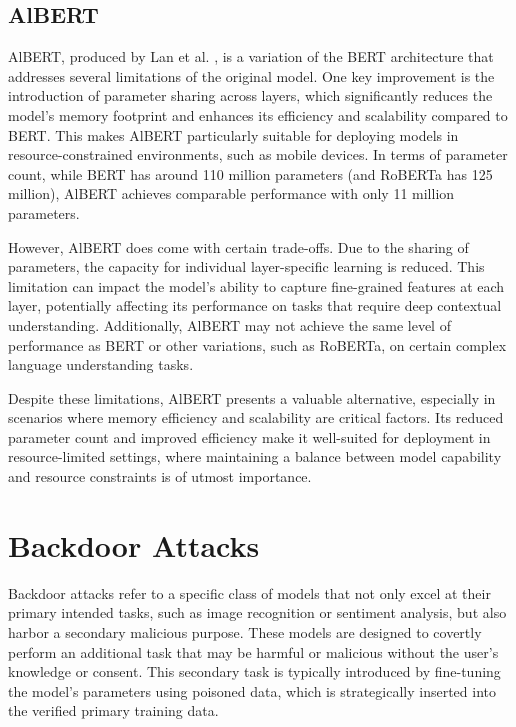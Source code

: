 \subsection{AlBERT}

AlBERT, produced by Lan et al. \cite{AlBERT}, is a variation of the BERT architecture that addresses several limitations of the original model. One key improvement is the introduction of parameter sharing across layers, which significantly reduces the model's memory footprint and enhances its efficiency and scalability compared to BERT. This makes AlBERT particularly suitable for deploying models in resource-constrained environments, such as mobile devices. In terms of parameter count, while BERT has around 110 million parameters (and RoBERTa has 125 million), AlBERT achieves comparable performance with only 11 million parameters.

However, AlBERT does come with certain trade-offs. Due to the sharing of parameters, the capacity for individual layer-specific learning is reduced. This limitation can impact the model's ability to capture fine-grained features at each layer, potentially affecting its performance on tasks that require deep contextual understanding. Additionally, AlBERT may not achieve the same level of performance as BERT or other variations, such as RoBERTa, on certain complex language understanding tasks.

Despite these limitations, AlBERT presents a valuable alternative, especially in scenarios where memory efficiency and scalability are critical factors. Its reduced parameter count and improved efficiency make it well-suited for deployment in resource-limited settings, where maintaining a balance between model capability and resource constraints is of utmost importance.

\section{Backdoor Attacks}

Backdoor attacks refer to a specific class of models that not only excel at their primary intended tasks, such as image recognition or sentiment analysis, but also harbor a secondary malicious purpose. These models are designed to covertly perform an additional task that may be harmful or malicious without the user's knowledge or consent. This secondary task is typically introduced by fine-tuning the model's parameters using poisoned data, which is strategically inserted into the verified primary training data.

